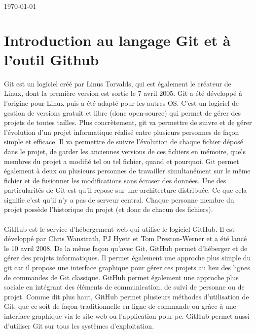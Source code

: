 \documentclass[11pt,canadien]{article}
\begin{document}
\begin{titlepage}

{\large \today}\\[2cm]

\vfill %

\end{titlepage}

\newpage
\tableofcontents

\newpage
\section{Introduction au langage Git et à l'outil Github}

\paragraph{} Git est un logiciel créé par Linus Torvalds, qui est également le créateur de Linux, dont la première version est sortie le 7 avril 2005. Git a été développé à l'origine pour Linux puis a été adapté pour les autres OS. C'est un logiciel de gestion de versions gratuit et libre (donc open-source) qui permet de gérer des projets de toutes tailles. Plus concrètement, git va permettre de suivre et de gérer l'évolution d'un projet informatique réalisé entre plusieurs personnes de façon simple et efficace. Il va permettre de suivre l'évolution de chaque fichier déposé dans le projet, de garder les anciennes versions de ces fichiers en mémoire, quels membres du projet a modifié tel ou tel fichier, quand et pourquoi. Git permet également à deux ou plusieurs personnes de travailler simultanément sur le même fichier et de fusionner les modifications sans écraser des données. Une des particularités de Git est qu'il repose sur une architecture distribuée. Ce que cela signifie c'est qu'il n'y a pas de serveur central. Chaque personne membre du projet possède l'historique du projet (et donc de chacun des fichiers).

\paragraph{} GitHub est le service d'hébergement web qui utilise le logiciel GitHub. Il est développé par Chris Wanstrath, PJ Hyett et Tom Preston-Werner et a été lancé le 10 avril 2008. De la même façon qu'avec Git, GitHub permet d'héberger et de gérer des projets informatiques. Il permet également une approche plus simple du git car il propose une interface graphique pour gérer ces projets au lieu des lignes de commandes de Git classique. GitHub permet également une approche plus sociale en intégrant des éléments de communication, de suivi de personne ou de projet. Comme dit plus haut, GitHub permet plusieurs méthodes d'utilisation de Git, que ce soit de façon traditionnelle en ligne de commande ou grâce à une interface graphique via le site web ou l'application pour pc. GitHub permet aussi d'utiliser Git sur tous les systèmes d'exploitation.
\end{document}
